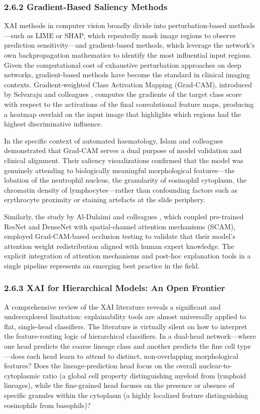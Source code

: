 \documentclass[11pt]{article}
\begin{document}
\subsubsection*{2.6.2 Gradient-Based Saliency Methods}

XAI methods in computer vision broadly divide into perturbation-based methods—such as LIME or SHAP, which repeatedly mask image regions to observe prediction sensitivity—and gradient-based methods, which leverage the network's own backpropagation mathematics to identify the most influential input regions. Given the computational cost of exhaustive perturbation approaches on deep networks, gradient-based methods have become the standard in clinical imaging contexts. Gradient-weighted Class Activation Mapping (Grad-CAM), introduced by Selvaraju and colleagues \cite{selvaraju2017}, computes the gradients of the target class score with respect to the activations of the final convolutional feature maps, producing a heatmap overlaid on the input image that highlights which regions had the highest discriminative influence.

In the specific context of automated haematology, Islam and colleagues \cite{islam2024} demonstrated that Grad-CAM serves a dual purpose of model validation and clinical alignment. Their saliency visualizations confirmed that the model was genuinely attending to biologically meaningful morphological features—the lobation of the neutrophil nucleus, the granularity of eosinophil cytoplasm, the chromatin density of lymphocytes—rather than confounding factors such as erythrocyte proximity or staining artefacts at the slide periphery.

Similarly, the study by Al-Dulaimi and colleagues \cite{aldulaimi2022}, which coupled pre-trained ResNet and DenseNet with spatial-channel attention mechanisms (SCAM), employed Grad-CAM-based occlusion testing to validate that their model's attention weight redistribution aligned with human expert knowledge. The explicit integration of attention mechanisms and post-hoc explanation tools in a single pipeline represents an emerging best practice in the field.

\subsubsection*{2.6.3 XAI for Hierarchical Models: An Open Frontier}

A comprehensive review of the XAI literature reveals a significant and underexplored limitation: explainability tools are almost universally applied to flat, single-head classifiers. The literature is virtually silent on how to interpret the feature-routing logic of hierarchical classifiers. In a dual-head network—where one head predicts the coarse lineage class and another predicts the fine cell type—does each head learn to attend to distinct, non-overlapping morphological features? Does the lineage-prediction head focus on the overall nuclear-to-cytoplasmic ratio (a global cell property distinguishing myeloid from lymphoid lineages), while the fine-grained head focuses on the presence or absence of specific granules within the cytoplasm (a highly localized feature distinguishing eosinophils from basophils)?
\end{document}
